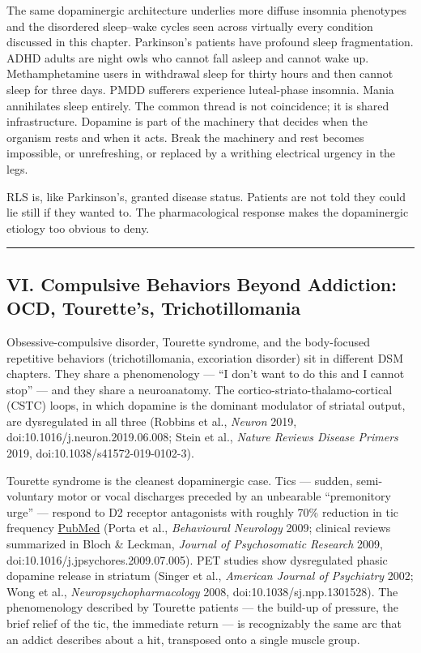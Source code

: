 The same dopaminergic architecture underlies more diffuse insomnia phenotypes and the disordered sleep--wake cycles seen across virtually every condition discussed in this chapter. Parkinson's patients have profound sleep fragmentation. ADHD adults are night owls who cannot fall asleep and cannot wake up. Methamphetamine users in withdrawal sleep for thirty hours and then cannot sleep for three days. PMDD sufferers experience luteal-phase insomnia. Mania annihilates sleep entirely. The common thread is not coincidence; it is shared infrastructure. Dopamine is part of the machinery that decides when the organism rests and when it acts. Break the machinery and rest becomes impossible, or unrefreshing, or replaced by a writhing electrical urgency in the legs.

RLS is, like Parkinson's, granted disease status. Patients are not told they could lie still if they wanted to. The pharmacological response makes the dopaminergic etiology too obvious to deny.

\begin{center}\rule{0.5\linewidth}{0.5pt}\end{center}

\subsection{VI. Compulsive Behaviors Beyond Addiction: OCD, Tourette's, Trichotillomania}\label{09_dopamine_spectrum-vi.-compulsive-behaviors-beyond-addiction-ocd-tourettes-trichotillomania}

Obsessive-compulsive disorder, Tourette syndrome, and the body-focused repetitive behaviors (trichotillomania, excoriation disorder) sit in different DSM chapters. They share a phenomenology --- ``I don't want to do this and I cannot stop'' --- and they share a neuroanatomy. The cortico-striato-thalamo-cortical (CSTC) loops, in which dopamine is the dominant modulator of striatal output, are dysregulated in all three (Robbins et al., \emph{Neuron} 2019, doi:10.1016/j.neuron.2019.06.008; Stein et al., \emph{Nature Reviews Disease Primers} 2019, doi:10.1038/s41572-019-0102-3).

Tourette syndrome is the cleanest dopaminergic case. Tics --- sudden, semi-voluntary motor or vocal discharges preceded by an unbearable ``premonitory urge'' --- respond to D2 receptor antagonists with roughly 70\% reduction in tic frequency \href{https://pubmed.ncbi.nlm.nih.gov/24295625/}{PubMed} (Porta et al., \emph{Behavioural Neurology} 2009; clinical reviews summarized in Bloch \& Leckman, \emph{Journal of Psychosomatic Research} 2009, doi:10.1016/j.jpsychores.2009.07.005). PET studies show dysregulated phasic dopamine release in striatum (Singer et al., \emph{American Journal of Psychiatry} 2002; Wong et al., \emph{Neuropsychopharmacology} 2008, doi:10.1038/sj.npp.1301528). The phenomenology described by Tourette patients --- the build-up of pressure, the brief relief of the tic, the immediate return --- is recognizably the same arc that an addict describes about a hit, transposed onto a single muscle group.

